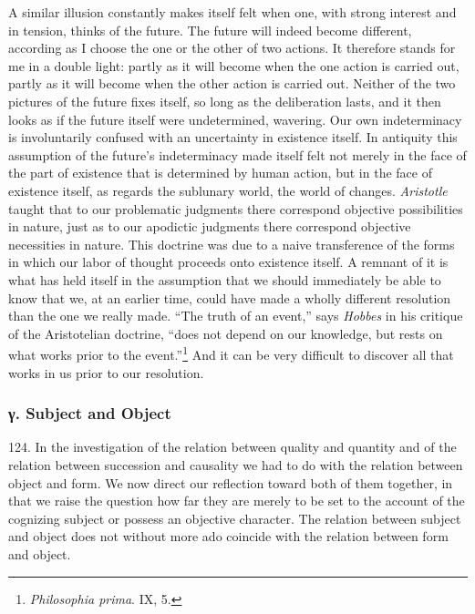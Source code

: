 \documentclass[12pt,a4paper]{book}
\newcommand{\opage}[1]{\marginnote{\footnotesize\textit{[#1]}}}
\begin{document}
\opage{295}A similar illusion constantly makes itself felt when one, with strong interest and in
tension, thinks of the future. The future will indeed become different, according as I
choose the one or the other of two actions. It therefore stands for me in a double
light: partly as it will become when the one action is carried out, partly as it will
become when the other action is carried out. Neither of the two pictures of the future
fixes itself, so long as the deliberation lasts, and it then looks as if the future
itself were undetermined, wavering. Our own indeterminacy is involuntarily confused
with an uncertainty in existence itself. In antiquity this assumption of the future's
indeterminacy made itself felt not merely in the face of the part of existence that is
determined by human action, but in the face of existence itself, as regards the
sublunary world, the world of changes. \emph{Aristotle} taught that to our problematic
judgments there correspond objective possibilities in nature, just as to our apodictic
judgments there correspond objective necessities in nature. This doctrine was due to a
naive transference of the forms in which our labor of thought proceeds onto existence
itself. A remnant of it is what has held itself in the assumption that we should
immediately be able to know that we, at an earlier time, could have made a wholly
different resolution than the one we really made. ``The truth of an event,'' says
\emph{Hobbes} in his critique of the Aristotelian doctrine, ``does not depend on our
knowledge, but rests on what works prior to the event.''\footnote{\emph{Philosophia
prima}. IX, 5.} And it can be very difficult to discover all that works in us prior to
our resolution.


\subsubsection*{γ. Subject and Object}

124. In the investigation of the relation between quality and quantity and of the
relation between succession and causality we had to do with the relation between
object and form. We now direct our reflection toward both of them together, in that
we raise the question how far they are merely to be set to the account of the
cognizing subject or possess an objective \opage{296}character. The relation between subject and
object does not without more ado coincide with the relation between form and object.
\end{document}

